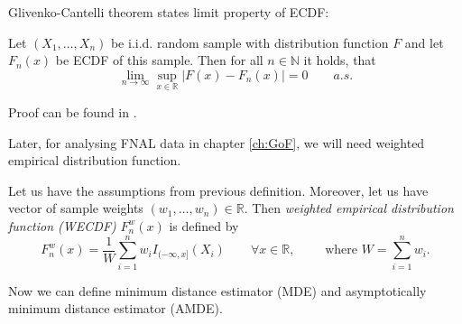 \noindent Glivenko-Cantelli theorem states limit property of ECDF:

\begin{theorem}
	Let $(X_1, \ldots,X_n)$ be i.i.d. random sample with distribution function $F$ and let $F_n(x)$ be ECDF of this sample. Then for all $n \in \mathbb{N}$ it holds, that
	\begin{equation}
	\lim_{n\rightarrow \infty} \sup_{x\in \mathbb{R}} |F(x) - F_n(x)| = 0  \qquad a.s.
	\end{equation}
	\label{theo:glivenko-cantelli}
\end{theorem}
\noindent Proof can be found in \cite{Devroye}.

Later, for analysing FNAL data in chapter \ref{ch:GoF}, we will need weighted empirical distribution function.
\begin{definition}
	Let us have the assumptions from previous definition. Moreover, let us have vector of sample weights $(w_1, \ldots,w_n) \in \mathbb{R}$. Then \emph{weighted empirical distribution function (WECDF)} $F^w_n(x)$ is defined by 
	\begin{equation}
	F^w_n(x) = \frac{1}{W} \sum_{i=1}^n w_i I_{(-\infty,x]}(X_i) \qquad \forall  x \in \mathbb{R},\qquad \text{ where }  W = \sum_{i=1}^n w_i.
	\label{eq:wecdf} 
	\end{equation}	
	\label{def:wecdf}
\end{definition}
%
%



\noindent Now we can define minimum distance estimator (MDE) and asymptotically minimum distance estimator (AMDE).

